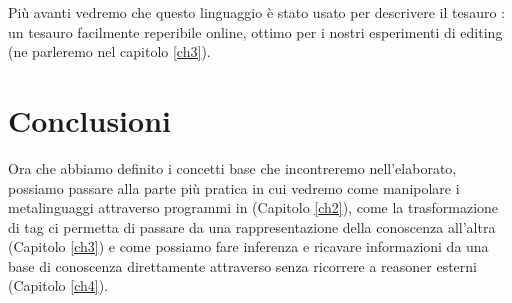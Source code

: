 Più avanti vedremo che questo linguaggio è stato usato per descrivere il tesauro : un tesauro facilmente reperibile online, ottimo per i nostri esperimenti di editing (ne parleremo nel capitolo \ref{ch3}).
\section{Conclusioni}
Ora che abbiamo definito i concetti base che incontreremo nell'elaborato, possiamo passare alla parte più pratica in cui vedremo come manipolare i metalinguaggi attraverso programmi in \cduce (Capitolo \ref{ch2}), come la trasformazione di tag ci permetta di passare da una rappresentazione della conoscenza all'altra (Capitolo \ref{ch3}) e come possiamo fare inferenza e ricavare informazioni da una base di conoscenza direttamente attraverso \cduce senza ricorrere a reasoner esterni (Capitolo \ref{ch4}).